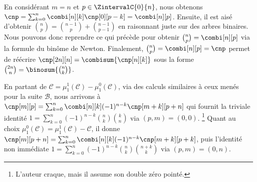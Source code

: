 En considérant $m = n$ et $p \in \ZintervalC{0}{n}$,
nous obtenons
$\cnp = \sum_{k=0}^n \combi[n][k] \cnp[0][p-k] = \combi[n][p]$.
%
Ensuite,
il est aisé d'obtenir
$\binom{n}{p} = \binom{n-1}{p} + \binom{n-1}{p-1}$
en raisonnant juste sur des arbres binaires.
%
Nous pouvons donc reprendre ce qui précède pour obtenir $\binom{n}{p} = \combi[n][p]$ via la formule du binôme de Newton.
%
Finalement,
$\binom{n}{p} = \combi[n][p] = \cnp$
permet de réécrire
$\cnp[2n][n] = \combisum{\cnp[n][k]}$
sous la forme
$\binom{2n}{n} = \binosum{\binom{n}{k}}$.




\begin{remark}
	En partant de
	$\mathcal{C} = \mu_1^1(\mathcal{C}) - \mu_1^0(\mathcal{C})$,
	via des calculs similaires à ceux menés pour la suite $\mathcal{B}$,
	nous arrivons à
    $\cnp[m][p] = \sum_{k=0}^n \combi[n][k] (-1)^{n-k} \cnp[m+k][p+n]$
    qui fournit la triviale identité
    $1 = \sum_{k=0}^n (-1)^{n-k} \binom{n}{k} \binom{k}{n}$
    via $(p,m) = (0,0)$.%
    \footnote{
    	L'auteur craque, mais il assume son double zéro pointé.
	}
    Quant au choix
	$\mu_1^0(\mathcal{C}) = \mu_1^1(\mathcal{C}) - \mathcal{C}$,
	il donne
    $\cnp[m][p+n] = \sum_{k=0}^n \combi[n][k] (-1)^{n-k} \cnp[m+k][p+k]$,
    puis l'identité non immédiate
    $1 = \sum_{k=0}^n (-1)^{n-k} \binom{n}{k} \binom{n+k}{k}$
    via $(p,m) = (0,n)$.
\end{remark}
